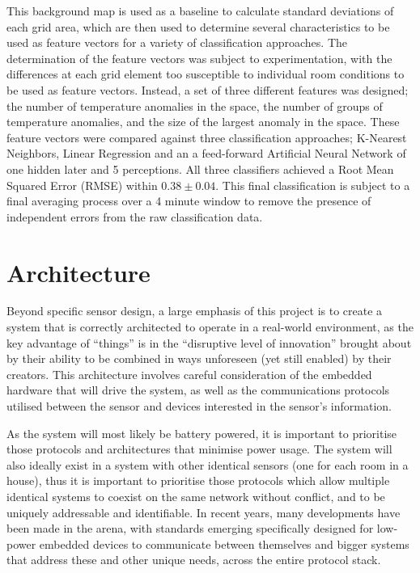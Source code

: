 \documentclass[../thesis/thesis.tex]{subfiles}
\begin{document}
This background map is used as a baseline to calculate standard deviations of each grid area, which are then used to determine several characteristics to be used as feature vectors for a variety of classification approaches. The determination of the feature vectors was subject to experimentation, with the differences at each grid element too susceptible to individual room conditions to be used as feature vectors. Instead, a set of three different features was designed; the number of temperature anomalies in the space, the number of groups of temperature anomalies, and the size of the largest anomaly in the space. These feature vectors were compared against three classification approaches; K-Nearest Neighbors, Linear Regression and an a feed-forward Artificial Neural Network of one hidden later and 5 perceptions. All three classifiers achieved a Root Mean Squared Error (RMSE) within $0.38\pm0.04$. This final classification is subject to a final averaging process over a 4 minute window to remove the presence of independent errors from the raw classification data.

\section{Architecture}
\label{sec:litreview:architecture}
Beyond specific sensor design, a large emphasis of this project is to create a system that is correctly architected to operate in a real-world \iot environment, as the key advantage of \iot ``things'' is in the ``disruptive level of innovation''\cite{atzori2010internet} brought about by their ability to be combined in ways unforeseen (yet still enabled) by their creators. This architecture involves careful consideration of the embedded hardware that will drive the system, as well as the communications protocols utilised between the sensor and devices interested in the sensor's information.

As the system will most likely be battery powered, it is important to prioritise those protocols and architectures that minimise power usage. The system will also ideally exist in a system with other identical sensors (one for each room in a house), thus it is important to prioritise those protocols which allow multiple identical systems to coexist on the same network without conflict, and to be uniquely addressable and identifiable. In recent years, many developments have been made in the \iot arena, with standards emerging specifically designed for low-power embedded devices to communicate between themselves and bigger systems that address these and other unique needs, across the entire protocol stack. 
\end{document}
